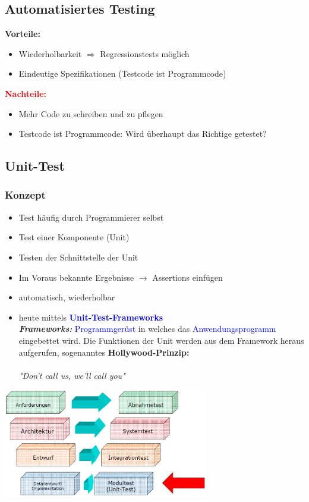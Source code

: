\subsection{Automatisiertes Testing}
\textbf{\textcolor{mygreen}{Vorteile:}}
\begin{itemize}
	\item Wiederholbarkeit \newline $\Rightarrow$ Regressionstests möglich
	\item Eindeutige Spezifikationen (Testcode ist Programmcode)
\end{itemize}	
\textbf{\textcolor{red}{Nachteile:}}
\begin{itemize}
	\item Mehr Code zu schreiben und zu pflegen
	\item Testcode ist Programmcode: Wird überhaupt das Richtige getestet?
\end{itemize}

\subsection{Unit-Test}
\subsubsection{Konzept}
\begin{minipage}{10.5cm}
	\begin{itemize}
		\item Test häufig durch Programmierer selbst
		\item Test einer Komponente (Unit)
		\item Testen der Schnittstelle der Unit
		\item Im Voraus bekannte Ergebnisse $\rightarrow$ Assertions einfügen
		\item automatisch, wiederholbar
		\item heute mittels \textcolor{blue}{\textbf{Unit-Test-Frameworks}} \\
	\textbf{\textit{Frameworks:}} \textcolor{blue}{Programmgerüst} in welches das \textcolor{blue}{Anwendungsprogramm} eingebettet wird. Die Funktionen der Unit werden aus dem Framework heraus aufgerufen, sogenanntes \textbf{Hollywood-Prinzip:}\\\\
		\textit{"{}Don't call us, we'll call you"}
	\end{itemize}
\end{minipage}
\begin{minipage}{9cm}
	\includegraphics[width=9cm]{images/unittest}
\end{minipage}

